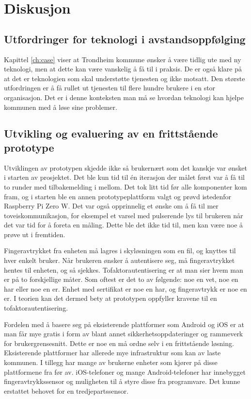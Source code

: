 \chapter{Diskusjon}
\label{ch:discussion}

\section{Utfordringer for teknologi i avstandsoppfølging}
Kapittel \ref{ch:case} viser at Trondheim kommune ønsker å være tidlig ute med ny teknologi, men at dette kan være vanskelig å
få til i praksis. De er også klare på at det er teknologien som skal understøtte tjenesten og ikke motsatt. Den største
utfordringen er å få rullet ut tjenesten til flere hundre brukere i en stor organisasjon. Det er i denne konteksten
man må se hvordan teknologi kan hjelpe kommunen med å løse sine problemer.

\section{Utvikling og evaluering av en frittstående prototype}
Utviklingen av prototypen skjedde ikke så brukernært som det kanskje var ønsket i starten av prosjektet. Det ble kun tid
til én iterasjon der målet først var å få til to runder med tilbakemelding i mellom. Det tok litt tid før alle komponenter kom fram,
og i starten ble en annen prototypeplattform valgt og prøvd istedenfor Raspberry Pi Zero W.
Det var også opprinnelig et ønske om å få til mer toveiskommunikasjon, for eksempel et varsel med pulserende lys til brukeren
når det var tid for å foreta en måling. Dette ble det ikke tid til, men kan være noe å prøve ut i fremtiden.

Fingeravtrykket fra enheten må lagres i skyløsningen som en fil, og knyttes til hver enkelt bruker. Når brukeren
ønsker å autentisere seg, må fingeravtrykket hentes til enheten, og så sjekkes. Tofaktorautentisering er at man
sier hvem man er på to forskjellige måter. Som oftest er det to av følgende: noe en vet, noe en har eller noe en er.
Enhet med sertifikat er noe en har, og fingeravtrykk er noe en er. I teorien kan det dermed bety at prototypen
oppfyller kravene til en tofaktorautentisering.

Fordelen med å basere seg på eksisterende plattformer som Android og iOS er at man får mye gratis i form
av blant annet sikkerhetsoppdateringer og rammeverk for brukergrensesnitt. Dette er noe en må ordne selv i en
frittstående løsning. Eksisterende plattformer har allerede mye infrastruktur som kan av laste kommunen. I tillegg
har mange av brukerne enheter som kjører på disse plattformene fra før av. iOS-telefoner og mange Android-telefoner
har innebygget fingeravtrykkssensor og muligheten til å styre disse fra programvare. Det kunne erstattet behovet for
en tredjepartssensor.

